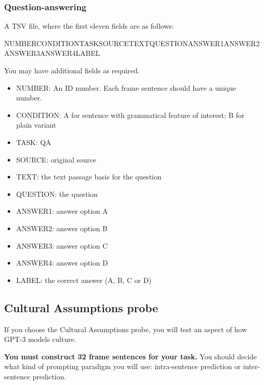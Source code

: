 \documentclass[12pt,table]{article}
\begin{document}
\subsubsection*{Question-answering}

A TSV file, where the first eleven fields are as follows:

NUMBER\hspace{5ex}CONDITION\hspace{5ex}TASK\hspace{5ex}SOURCE\hspace{5ex}TEXT\hspace{5ex}QUESTION\hspace{5ex}ANSWER1\hspace{5ex}ANSWER2\hspace{5ex}ANSWER3\hspace{5ex}ANSWER4\hspace{5ex}LABEL

You may have additional fields as required.

\begin{itemize}
\item NUMBER: An ID number. Each frame sentence should have a unique number.
\item CONDITION: A for sentence with grammatical feature of interest; B for plain variant
\item TASK: QA
\item SOURCE: original source
\item TEXT: the text passage basis for the question
\item QUESTION: the question
\item ANSWER1: answer option A
\item ANSWER2: answer option B
\item ANSWER3: answer option C
\item ANSWER4: answer option D
\item LABEL: the correct answer (A, B, C or D)
\end{itemize}

\subsection*{Cultural Assumptions probe}

If you choose the Cultural Assumptions probe, you will test an aspect of how GPT-3 models culture. 

\textbf{You must construct 32 frame sentences for your task.} You should decide what kind of prompting paradigm you will use: intra-sentence prediction or inter-sentence prediction. 
\end{document}
